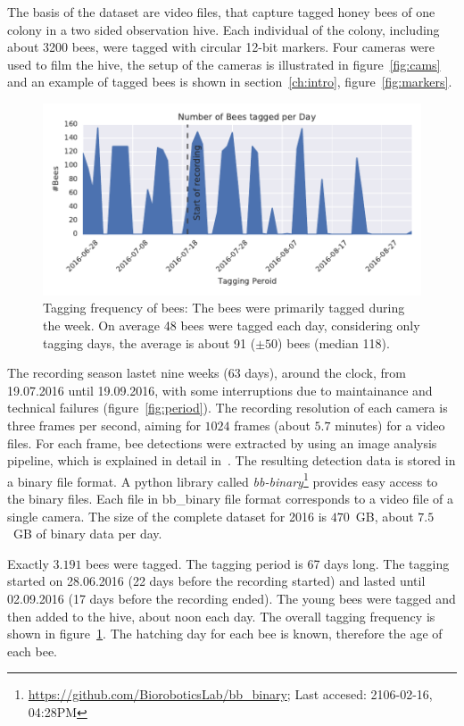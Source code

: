 The basis of the dataset are video files, that capture tagged honey bees of one colony in a two sided observation hive.
Each individual of the colony, including about 3200 bees, were tagged with circular 12-bit markers. Four cameras were used to film the hive, the setup of the cameras is illustrated in figure~\ref{fig:cams} and an example of tagged bees is shown in section~\ref{ch:intro}, figure~\ref{fig:markers}.

\begin{figure}[htb]
	\centering
	\includegraphics[width=1.0\textwidth]{Figures/tagging_period}
	\caption[Tagging Frequency]{Tagging frequency of bees: The bees were primarily tagged during the week. On average 48 bees were tagged each day, considering only tagging days, the average is about 91 ($\pm50$) bees (median 118).}
	\label{fig:tagging}
\end{figure}

The recording season lastet nine weeks (63 days), around the clock, from 19.07.2016 until 19.09.2016, with some interruptions due to maintainance and technical failures (figure~\ref{fig:period}). The recording resolution of each camera is three frames per second, aiming for $1024$ frames (about $5.7$ minutes) for a video files. For each frame, bee detections were extracted by using an image analysis pipeline, which is explained in detail in~\cite{wario2015automatic}. The resulting detection data is stored in a binary file format.
A python library called \emph{bb-binary}\footnote{\url{https://github.com/BioroboticsLab/bb_binary}; Last accesed: 2106-02-16, 04:28PM} provides easy access to the binary files. Each file in bb\_binary file format corresponds to a video file of a single camera.
The size of the complete dataset for 2016 is $470$~GB, about $7.5$~GB of binary data per day.

Exactly $3.191$ bees were tagged. The tagging period is 67 days long. The tagging started on 28.06.2016 (22 days before the recording started) and lasted until 02.09.2016 (17 days before the recording ended). The young bees were tagged and then added to the hive, about noon each day. The overall tagging frequency is shown in figure~\ref{fig:tagging}. The hatching day for each bee is known, therefore the age of each bee.



